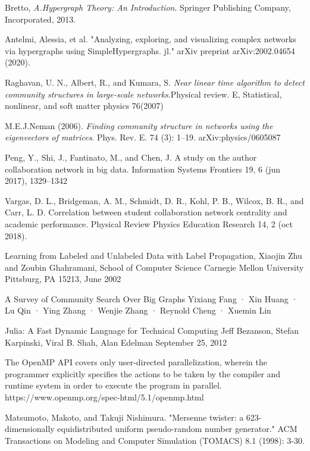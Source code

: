 \documentclass[conference]{IEEEtran}
\begin{document}
\begin{thebibliography}{1}

Bretto, \emph{A.Hypergraph Theory: An Introduction}.  Springer Publishing Company, Incorporated, 2013.

Antelmi, Alessia, et al. "Analyzing, exploring, and visualizing complex networks via hypergraphs using SimpleHypergraphs. jl." arXiv preprint arXiv:2002.04654 (2020).

Raghavan, U. N., Albert, R., and Kumara, S. \emph{Near linear time algorithm to detect community structures in large-scale networks}.Physical review. E, Statistical, nonlinear, and soft matter physics 76(2007)

M.E.J.Neman (2006). \textit{Finding community structure in networks using the eigenvectors of matrices}. Phys. Rev. E. 74 (3): 1–19. arXiv:physics/0605087

Peng, Y., Shi, J., Fantinato, M., and Chen, J. A study on the author collaboration network in big data. Information Systems Frontiers 19, 6 (jun 2017),
1329–1342

Vargas, D. L., Bridgeman, A. M., Schmidt, D. R., Kohl, P. B., Wilcox,
B. R., and Carr, L. D. Correlation between student collaboration network
centrality and academic performance. Physical Review Physics Education Research
14, 2 (oct 2018).

Learning from Labeled and Unlabeled Data with Label Propagation,
Xiaojin Zhu and Zoubin Ghahramani,
School of Computer Science Carnegie Mellon University Pittsburg, PA 15213,
June 2002

A Survey of Community Search Over Big Graphs
Yixiang Fang · Xin Huang · Lu Qin · Ying Zhang ·
Wenjie Zhang · Reynold Cheng · Xuemin Lin

Julia: A Fast Dynamic Language for Technical Computing
Jeff Bezanson, Stefan Karpinski, Viral B. Shah, Alan Edelman
September 25, 2012

The OpenMP API covers only user-directed parallelization, wherein the programmer explicitly specifies the actions to be taken by the compiler and runtime system in order to execute the program in parallel.
https://www.openmp.org/spec-html/5.1/openmp.html

Matsumoto, Makoto, and Takuji Nishimura. "Mersenne twister: a 623-dimensionally equidistributed uniform pseudo-random number generator." ACM Transactions on Modeling and Computer Simulation (TOMACS) 8.1 (1998): 3-30.


\end{thebibliography}
\end{document}
